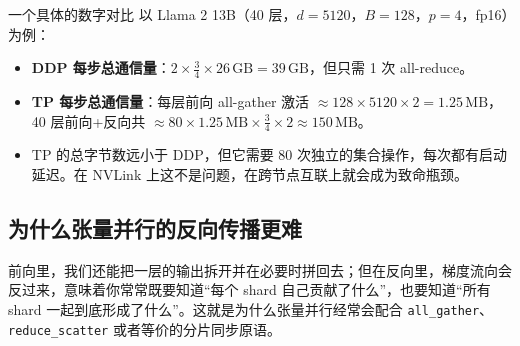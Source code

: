 \begin{table}[H]
\centering
\small
{}
\caption{数据并行 vs 张量并行通信量对比}
\end{table}

\begin{knowledgebox}{一个具体的数字对比}
以 Llama 2 13B（40 层，$d=5120$，$B=128$，$p=4$，fp16）为例：
\begin{itemize}
    \item \textbf{DDP 每步总通信量}：$2 \times \frac{3}{4} \times 26\,\text{GB} = 39\,\text{GB}$，但只需 1 次 all-reduce。
    \item \textbf{TP 每步总通信量}：每层前向 all-gather 激活 $\approx 128 \times 5120 \times 2 = 1.25\,\text{MB}$，40 层前向+反向共 $\approx 80 \times 1.25\,\text{MB} \times \frac{3}{4} \times 2 \approx 150\,\text{MB}$。
    \item TP 的总字节数远小于 DDP，但它需要 80 次独立的集合操作，每次都有启动延迟。在 NVLink 上这不是问题，在跨节点互联上就会成为致命瓶颈。
\end{itemize}
\end{knowledgebox}

\subsection{为什么张量并行的反向传播更难}

前向里，我们还能把一层的输出拆开并在必要时拼回去；但在反向里，梯度流向会反过来，意味着你常常既要知道“每个 shard 自己贡献了什么”，也要知道“所有 shard 一起到底形成了什么”。这就是为什么张量并行经常会配合 \texttt{all\_gather}、\texttt{reduce\_scatter} 或者等价的分片同步原语。

